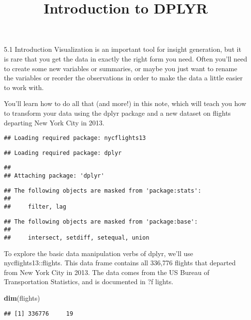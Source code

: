 \documentclass[
]{article}
\title{Introduction to DPLYR}
\author{}
\date{\vspace{-2.5em}}
\newenvironment{Shaded}{\begin{snugshade}}{\end{snugshade}}
\newcommand{\FunctionTok}[1]{\textcolor[rgb]{0.13,0.29,0.53}{\textbf{#1}}}
\newcommand{\NormalTok}[1]{#1}
\begin{document}
\maketitle

5.1 Introduction Visualization is an important tool for insight
generation, but it is rare that you get the data in exactly the right
form you need. Often you'll need to create some new variables or
summaries, or maybe you just want to rename the variables or reorder the
observations in order to make the data a little easier to work with.

You'll learn how to do all that (and more!) in this note, which will
teach you how to transform your data using the dplyr package and a new
dataset on flights departing New York City in 2013.

\begin{verbatim}
## Loading required package: nycflights13
\end{verbatim}

\begin{verbatim}
## Loading required package: dplyr
\end{verbatim}

\begin{verbatim}
## 
## Attaching package: 'dplyr'
\end{verbatim}

\begin{verbatim}
## The following objects are masked from 'package:stats':
## 
##     filter, lag
\end{verbatim}

\begin{verbatim}
## The following objects are masked from 'package:base':
## 
##     intersect, setdiff, setequal, union
\end{verbatim}

To explore the basic data manipulation verbs of dplyr, we'll use
nycflights13::flights. This data frame contains all 336,776 flights that
departed from New York City in 2013. The data comes from the US Bureau
of Transportation Statistics, and is documented in ?f lights.

\begin{Shaded}
\begin{Highlighting}[]
\FunctionTok{dim}\NormalTok{(flights)}
\end{Highlighting}
\end{Shaded}

\begin{verbatim}
## [1] 336776     19
\end{verbatim}
\end{document}
